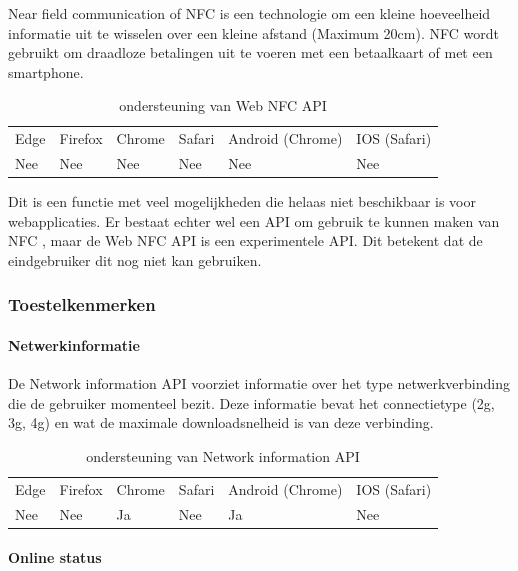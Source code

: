 Near field communication of NFC is een technologie om een kleine hoeveelheid informatie uit te wisselen over een kleine afstand (Maximum 20cm). NFC wordt gebruikt om draadloze betalingen uit te voeren met een betaalkaart of met een smartphone. 
\autocite{Paus2007}

\begin{table}[H]
	\centering
	\begin{tabular}{llllll}
		Edge & Firefox & Chrome & Safari & Android (Chrome) & IOS (Safari) \\
		Nee   & Nee      &  Nee     & Nee     & Nee               & Nee          
	\end{tabular}	
	\caption{ondersteuning van Web NFC API }
\end{table}

Dit is een functie met veel mogelijkheden die helaas niet beschikbaar is voor webapplicaties.
Er bestaat echter wel een API om gebruik te kunnen maken van NFC \autocite{RohdeChristiansen2020}, maar de Web NFC API is een experimentele API. Dit betekent dat de eindgebruiker dit nog niet kan gebruiken.



\subsubsection{Toestelkenmerken}


\paragraph{Netwerkinformatie}

De Network information API \autocite{Lamouri2020} voorziet informatie over het type netwerkverbinding die de gebruiker momenteel bezit. Deze informatie bevat het connectietype (2g, 3g, 4g) en wat de maximale downloadsnelheid is van deze verbinding.

\begin{table}[H]
	\centering
	\begin{tabular}{llllll}
		Edge & Firefox & Chrome & Safari & Android (Chrome) & IOS (Safari) \\
		Nee   & Nee      &  Ja     & Nee     & Ja               & Nee          
	\end{tabular}	
	\caption{ondersteuning van Network information API }
\end{table}

\paragraph{Online status}

